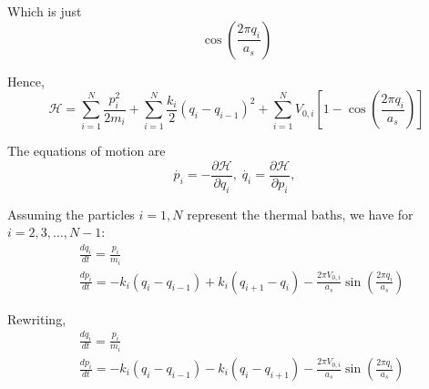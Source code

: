Which is just
\[ \cos \left( \frac{2\pi q_{i}}{a_{s}}\right) \]

Hence, 
\[ 
\mathcal{H} = \sum_{i=1}^{N}\frac{p_{i}^{2}}{2m_i} + 
\sum_{i=1}^{N} \frac{k_i}{2}(q_{i} - q_{i-1})^{2} +
\sum_{i=1}^{N} V_{0,i}\left[1 - 
\cos \left( \frac{2\pi q_{i}}{a_{s}}\right)\right]
\]

The equations of motion are
\[
\dot{p_i} = -\frac{\partial\mathcal{H}}{\partial q_i}, \;
\dot{q_i} = \frac{\partial\mathcal{H}}{\partial p_i}, \;
\]

Assuming the particles $ i=1,N $ represent the thermal baths, we have for $ i=2, 3, \dots, N-1 $:
\begin{align*}
&\frac{dq_i}{dt} = \frac{p_{i}}{m_i} \\
&\frac{dp_i}{dt} = -k_{i}(q_{i}-q_{i-1}) + k_{i}(q_{i+1}-q_i) - 
\frac{2\pi V_{0,i}}{a_s}\sin \left(\frac{2\pi q_i}{a_s}\right)
\end{align*}

Rewriting, 
\begin{align*}
&\frac{dq_i}{dt} = \frac{p_{i}}{m_i} \\
&\frac{dp_i}{dt} = -k_{i}(q_{i}-q_{i-1}) - k_{i}(q_{i} - q_{i+1}) - 
\frac{2\pi V_{0,i}}{a_s}\sin \left(\frac{2\pi q_i}{a_s}\right)
\end{align*}


